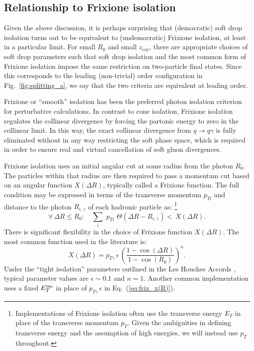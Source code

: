 \documentclass[a4paper,11pt]{article}
\DeclareRobustCommand{\Fig}[1]{Fig.~\ref{#1}}
\DeclareRobustCommand{\Eq}[1]{Eq.~(\ref{#1})}
\begin{document}
\subsection{Relationship to Frixione isolation}
\label{sec:2.3}

Given the above discussion, it is perhaps surprising that (democratic) soft drop isolation turns out to be equivalent to (undemocratic) Frixione isolation, at least in a particular limit.
%
For small $R_0$ and small $z_{\text{cut}}$, there are appropriate choices of soft drop parameters such that soft drop isolation and the most common form of Frixione isolation impose the same restriction on two-particle final states.
%
Since this corresponds to the leading (non-trivial) order configuration in \Fig{fig:splitting_a}, we say that the two criteria are equivalent at leading order.

Frixione or ``smooth'' isolation \cite{Frixione:1998jh} has been the preferred photon isolation criterion for perturbative calculations.
%
In contrast to cone isolation, Frixione isolation regulates the collinear divergence by forcing the partonic energy to zero in the collinear limit.
%
In this way, the exact collinear divergence from $q \to q \gamma$ is fully eliminated without in any way restricting the soft phase space, which is required in order to ensure real and virtual cancellation of soft gluon divergences.

Frixione isolation uses an initial angular cut at some radius from the photon $R_0$.
%
The particles within that radius are then required to pass a momentum cut based on an angular function $X(\Delta R)$, typically called a Frixione function.
%
The full condition may be expressed in terms of the transverse momentum $p_{T i}$ and distance to the photon $R_{i,\gamma}$ of each hadronic particle as:%
%
\footnote{Implementations of Frixione isolation often use the transverse energy $E_T$ in place of the transverse momentum $p_T$.  Given the ambiguities in defining transverse energy and the assumption of high energies, we will instead use $p_T$ throughout.}
%
\begin{equation}
    \forall\, \Delta R \leq R_0:\quad \sum_{i} \,\, p_{T i} \,\, \Theta\left(\Delta R - R_{i,\gamma}\right) < \, X(\Delta R).
\end{equation}
%
There is significant flexibility in the choice of Frixione function $X(\Delta R)$.
%
The most common function used in the literature \cite{Frixione:1998jh,Cieri:2015wwa,Binoth:2010nha,AlcarazMaestre:2012vp,Andersen:2014efa,Aaboud:2017lxm,Aaboud:2017kff} is:
%
\begin{equation}
\label{eq:frix_x(R)}
X(\Delta R) = p_{T \gamma} \, \epsilon \, \left(\frac{1 - \cos(\Delta R)}{1 - \cos(R_0)}\right)^n.
\end{equation}
%
Under the ``tight isolation'' parameters outlined in the Les Houches Accords \cite{Andersen:2014efa}, typical parameter values are $\epsilon \sim 0.1$ and $n = 1$. Another common implementation \cite{Cieri:2015wwa, Andersen:2014efa} uses a fixed $E_T^{\rm iso}$ in place of $p_{T \gamma} \, \epsilon$ in \Eq{eq:frix_x(R)}.
\end{document}
